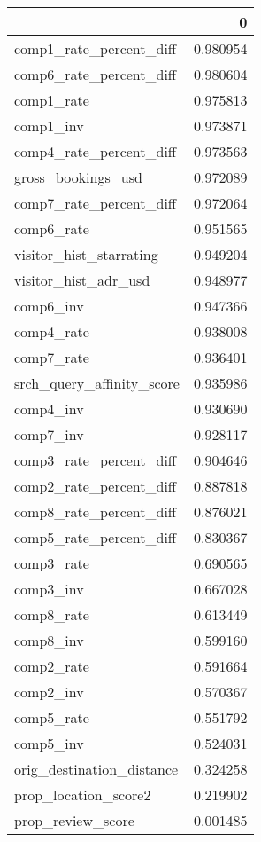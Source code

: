 \begin{tabular}{lr}
\toprule
 & 0 \\
\midrule
comp1_rate_percent_diff & 0.980954 \\
comp6_rate_percent_diff & 0.980604 \\
comp1_rate & 0.975813 \\
comp1_inv & 0.973871 \\
comp4_rate_percent_diff & 0.973563 \\
gross_bookings_usd & 0.972089 \\
comp7_rate_percent_diff & 0.972064 \\
comp6_rate & 0.951565 \\
visitor_hist_starrating & 0.949204 \\
visitor_hist_adr_usd & 0.948977 \\
comp6_inv & 0.947366 \\
comp4_rate & 0.938008 \\
comp7_rate & 0.936401 \\
srch_query_affinity_score & 0.935986 \\
comp4_inv & 0.930690 \\
comp7_inv & 0.928117 \\
comp3_rate_percent_diff & 0.904646 \\
comp2_rate_percent_diff & 0.887818 \\
comp8_rate_percent_diff & 0.876021 \\
comp5_rate_percent_diff & 0.830367 \\
comp3_rate & 0.690565 \\
comp3_inv & 0.667028 \\
comp8_rate & 0.613449 \\
comp8_inv & 0.599160 \\
comp2_rate & 0.591664 \\
comp2_inv & 0.570367 \\
comp5_rate & 0.551792 \\
comp5_inv & 0.524031 \\
orig_destination_distance & 0.324258 \\
prop_location_score2 & 0.219902 \\
prop_review_score & 0.001485 \\
\bottomrule
\end{tabular}
